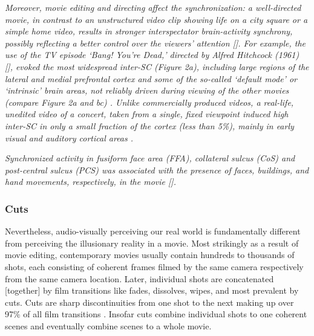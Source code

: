 \documentclass[10pt,a4paper,twocolumn]{article}
\begin{document}
\emph{Moreover, movie editing and directing affect the synchronization:
	a well-directed movie, in contrast to an unstructured video clip showing
	life on a city square or a simple home video, results in stronger
	interspectator brain-activity synchrony, possibly reflecting a better
	control over the viewers' attention {[}\citet{hasson_2008_hierarchy_temporal_windows,malinen_2007_towards_natural_stimulation}{]}.
	For example, the use of the TV episode \textquoteleft Bang! You\textquoteright re
	Dead,\textquoteright{} directed by Alfred Hitchcock (1961) {[}\citet{hasson_2008_neurocinematics}{]},
	evoked the most widespread inter-SC (Figure 2a), including large regions
	of the lateral and medial prefrontal cortex and some of the so-called
	\textquoteleft default mode\textquoteright{} or \textquoteleft intrinsic\textquoteright{}
	brain areas, not reliably driven during viewing of the other movies
	(compare Figure 2a and b\textendash c) \citep{hasson_2009_natural_stim_review}.
	Unlike commercially produced videos, a real-life, unedited video of
	a concert, taken from a single, fixed viewpoint induced high inter-SC
	in only a small fraction of the cortex (less than 5\%), mainly in
	early visual and auditory cortical areas \citep{hasson_2009_natural_stim_review}.}

\emph{Synchronized activity in fusiform face area (FFA), collateral
	sulcus (CoS) and post-central sulcus (PCS) was associated with the
	presence of faces, buildings, and hand movements, respectively, in
	the movie {[}\citet{hasson_2004_synchronization_natural_vision}{]}\citep{lankinen_2014_MEG_during_movie}.}


\subsubsection*{Cuts }

Nevertheless, audio-visually perceiving our real world is fundamentally
different from perceiving the illusionary reality in a movie. Most
strikingly as a result of movie editing, contemporary movies usually
contain hundreds to thousands of shots, each consisting of coherent
frames filmed by the same camera respectively from the same camera
location. Later, individual shots are concatenated {[}together{]}
by film transitions like fades, dissolves, wipes, and most prevalent
by cuts. Cuts are sharp discontinuities from one shot to the next
making up over 97\% of all film transitions \citep{cutting_2011_changing_poetics_of_dissolve}.
Insofar cuts combine individual shots to one coherent scenes and eventually
combine scenes to a whole movie. 
\end{document}
